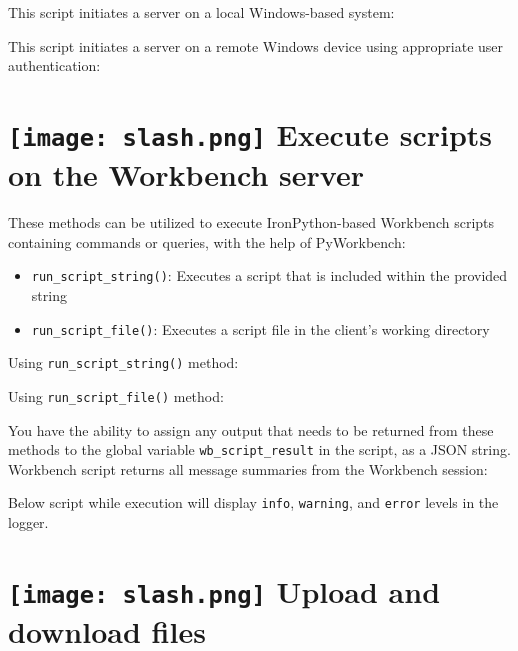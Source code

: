 \documentclass[9pt,landscape]{article}
\begin{document}
\begin{multicols}{3}
This script initiates a server on a local Windows-based system:

This script initiates a server on a remote Windows device using appropriate user authentication:

\section{\texttt{[image: slash.png]} Execute scripts on the Workbench server}

These methods can be utilized to execute IronPython-based Workbench scripts containing commands or queries, with the help of PyWorkbench:

\begin{itemize}
\item \texttt{run_script_string()}: Executes a script that is included within the provided string
\item \texttt{run_script_file()}: Executes a script file in the client's working directory
\end{itemize}    

Using \texttt{run_script_string()} method:

Using \texttt{run_script_file()} method:

You have the ability to assign any output that needs to be returned from these methods to the global variable \texttt{wb_script_result} in the script, as a JSON string.
Workbench script returns all message summaries from the Workbench session:

Below script while execution will display \texttt{info}, \texttt{warning}, and \texttt{error} levels in the logger.


\vfill

\section{\texttt{[image: slash.png]} Upload and download files}


\end{multicols}
\end{document}

